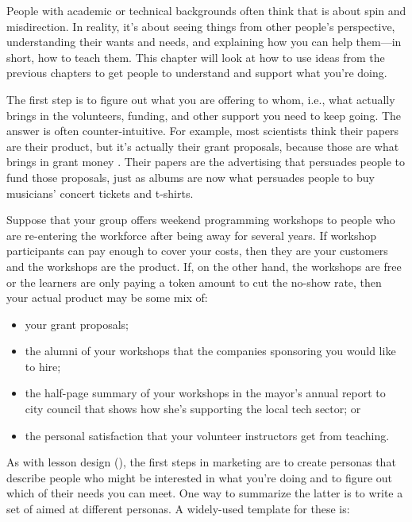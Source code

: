 
People with academic or technical backgrounds often think that
 is about spin and misdirection.
In reality,
it's about seeing things from other people's perspective,
understanding their wants and needs,
and explaining how you can help them---in short,
how to teach them.
This chapter will look at how to use ideas from the previous chapters
to get people to understand and support what you're doing.


The first step is to figure out what you are offering to whom,
i.e.,
what actually brings in the volunteers,
funding,
and other support you need to keep going.
The answer is often counter-intuitive.
For example,
most scientists think their papers are their product,
but it's actually their grant proposals,
because those are what brings in grant money \cite{Kuch2011}.
Their papers are the advertising that persuades people to fund those proposals,
just as albums are now what persuades people to buy musicians' concert tickets and t-shirts.

Suppose that your group offers weekend programming workshops
to people who are re-entering the workforce after being away for several years.
If workshop participants can pay enough to cover your costs,
then they are your customers and the workshops are the product.
If,
on the other hand,
the workshops are free or the learners are only paying a token amount to cut the no-show rate,
then your actual product may be some mix of:

\begin{itemize}

\item
  your grant proposals;

\item
  the alumni of your workshops
  that the companies sponsoring you would like to hire;

\item
  the half-page summary of your workshops in the mayor's annual report to city council
  that shows how she's supporting the local tech sector;
  or

\item
  the personal satisfaction that your volunteer instructors get from teaching.

\end{itemize}

As with lesson design (),
the first steps in marketing are
to create personas that describe people who might be interested in what you're doing
and to figure out which of their needs you can meet.
One way to summarize the latter is to write a set of 
aimed at different personas.
A widely-used template for these is:

